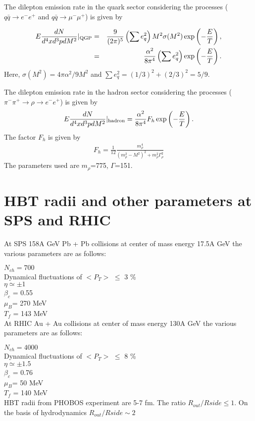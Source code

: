  The dilepton emission rate in the quark sector considering the 
processes ($q \bar q \rightarrow e^- e^+$ and 
$q \bar q \rightarrow \mu^- \mu^+$)
is given by 

\begin{eqnarray}\label{}
E {dN \over d^4x d^3p dM^2}|_{\rm QGP}
&=& \frac{9}{(2\pi)^5}  \left(\sum e_q^2\right) M^2 \sigma(M^2)
        \exp\left(-\frac{E}{T}\right), \nonumber \\
&=& \frac{\alpha^2}{8\pi^4} \left(\sum e_q^2\right) 
        \exp\left(-\frac{E}{T}\right).
\end{eqnarray}
Here, $\sigma(M^2)=4\pi\alpha^2/9M^2$ and
$\sum e_q^2 =  (1/3)^2 + (2/3)^2 =5/9$.

 The dilepton emission rate in the hadron sector considering the 
processes ($\pi^- \pi^+ \rightarrow \rho \rightarrow e^- e^+$)
is given by 
\begin{eqnarray}\label{}
E {dN \over d^4x d^3p dM^2}|_{\rm hadron}
 = \frac{\alpha^2}{8\pi^4} F_h
        \exp\left(-\frac{E}{T}\right).
\end{eqnarray}
The factor $F_h$ is given by
\begin{eqnarray}\label{}
F_h = \frac{1}{12} \frac{m_\rho^4}{(m_\rho^2-M^2)^2 + m_\rho^2 \Gamma_\rho^2}
\end{eqnarray}
The parameters used are $m_\rho$=775, $\Gamma$=151.


\section{HBT radii and other parameters at SPS and RHIC}
At SPS 158A GeV Pb + Pb collisions at center of mass energy 
17.5A GeV the various parameters are as follows:

$N_{ch}= 700$ \\
Dynamical fluctuations of $<P_T>$ $\leq$ 3 \% \\
$\eta \simeq \pm 1$ \\
$\beta_c$ = 0.55 \\
$\mu_B$= 270 MeV \\
$T_f$ = 143 MeV \\

At RHIC Au + Au collisions at center of mass energy 
130A GeV the various parameters are as follows:

$N_{ch}= 4000$ \\
Dynamical fluctuations of $<P_T>$ $\leq$ 8 \% \\
$\eta \simeq \pm 1.5$ \\
$\beta_c$ = 0.76 \\
$\mu_B$= 50 MeV \\
$T_f$ = 140 MeV \\

HBT radii from PHOBOS experiment are 5-7 fm.
The ratio $R_{out}/R{side} \leq 1$. 
On the basis of hydrodynamics $R_{out}/R{side} \sim 2$





